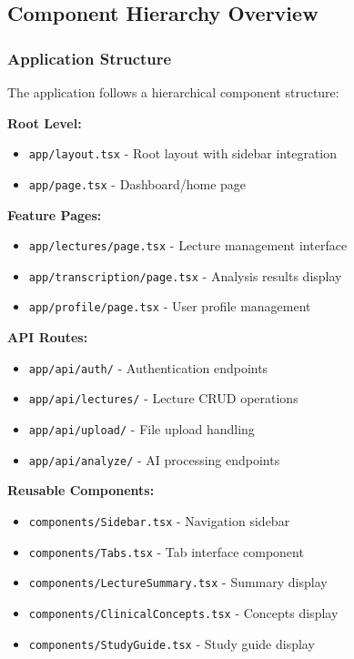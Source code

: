 \documentclass[12pt,a4paper]{article}
\newcommand{\code}[1]{\texttt{#1}}
\begin{document}
\subsection{Component Hierarchy Overview}

\subsubsection{Application Structure}

The application follows a hierarchical component structure:

\textbf{Root Level:}
\begin{itemize}
    \item \code{app/layout.tsx} - Root layout with sidebar integration
    \item \code{app/page.tsx} - Dashboard/home page
\end{itemize}

\textbf{Feature Pages:}
\begin{itemize}
    \item \code{app/lectures/page.tsx} - Lecture management interface
    \item \code{app/transcription/page.tsx} - Analysis results display
    \item \code{app/profile/page.tsx} - User profile management
\end{itemize}

\textbf{API Routes:}
\begin{itemize}
    \item \code{app/api/auth/} - Authentication endpoints
    \item \code{app/api/lectures/} - Lecture CRUD operations
    \item \code{app/api/upload/} - File upload handling
    \item \code{app/api/analyze/} - AI processing endpoints
\end{itemize}

\textbf{Reusable Components:}
\begin{itemize}
    \item \code{components/Sidebar.tsx} - Navigation sidebar
    \item \code{components/Tabs.tsx} - Tab interface component
    \item \code{components/LectureSummary.tsx} - Summary display
    \item \code{components/ClinicalConcepts.tsx} - Concepts display
    \item \code{components/StudyGuide.tsx} - Study guide display
\end{itemize}
\end{document}
